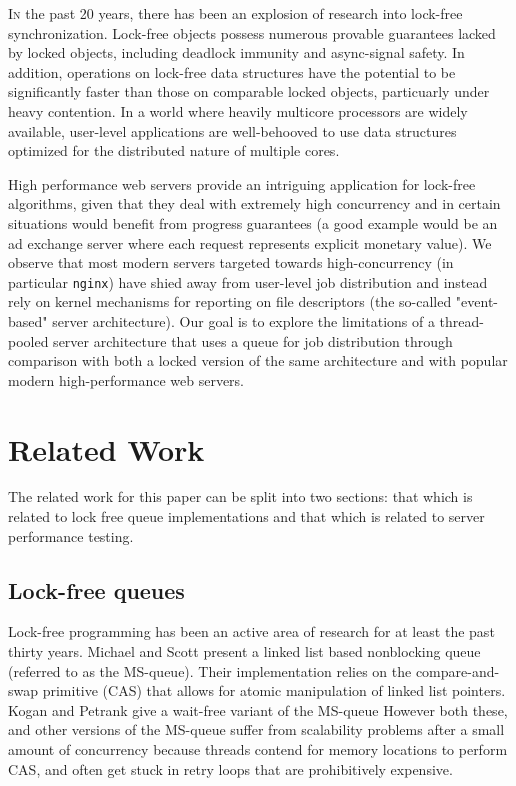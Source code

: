 \documentclass[twoside]{article}
\begin{document}
\begin{multicols}{2}
  \lettrine[nindent=0em,lines=3]{I}n the past 20 years, there has been
  an explosion of research into lock-free synchronization. Lock-free
  objects possess numerous provable guarantees lacked by locked
  objects, including deadlock immunity and async-signal safety. In
  addition, operations on lock-free data structures have the potential
  to be significantly faster than those on comparable locked objects,
  particuarly under heavy contention. In a world where heavily
  multicore processors are widely available, user-level applications
  are well-behooved to use data structures optimized for the
  distributed nature of multiple cores.
  
High performance web servers provide an intriguing application for
lock-free algorithms, given that they deal with extremely high
concurrency and in certain situations would benefit from progress
guarantees (a good example would be an ad exchange server where each
request represents explicit monetary value). We observe that most
modern servers targeted towards high-concurrency (in particular
\verb+nginx+) have shied away from user-level job distribution and
instead rely on kernel mechanisms for reporting on file descriptors
(the so-called "event-based" server architecture). Our goal is to
explore the limitations of a thread-pooled server architecture that
uses a queue for job distribution through comparison with both a
locked version of the same architecture and with popular modern
high-performance web servers.

\section{Related Work}

The related work for this paper can be split into two sections: that
which is related to lock free queue implementations and that which is
related to server performance testing.

\subsection{Lock-free queues}

Lock-free programming has been an active area of research for at least the
past thirty years. Michael and Scott present a linked list based nonblocking
queue (referred to as the MS-queue). Their implementation relies on the
compare-and-swap primitive (CAS) that allows for atomic manipulation of linked 
list pointers. Kogan and Petrank give a wait-free variant of the MS-queue However both these, and other versions of the MS-queue suffer from scalability
problems after a small amount of concurrency because threads contend for
memory locations to perform CAS, and often get stuck in retry loops that are
prohibitively expensive. 


\end{multicols}
\end{document}
